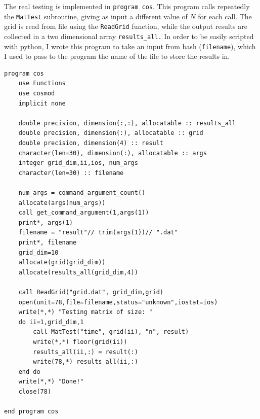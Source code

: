 \documentclass[a4paper]{article}
\begin{document}
\noindent The real testing is implemented in \lstinline{program cos}.
This program calls repeatedly the \lstinline{MatTest} subroutine, giving as input a different value of $N$ for each call.
The grid is read from file using the \lstinline{ReadGrid} function, while the output results are collected in a two dimensional array \lstinline{results_all.}
In order to be easily scripted with python, I wrote this program to take an input from bash (\lstinline{filename}), which I used to pass to the program the name of the file to store the results in.
\begin{lstlisting}
program cos
    use Functions
    use cosmod
    implicit none

    double precision, dimension(:,:), allocatable :: results_all
    double precision, dimension(:), allocatable :: grid
    double precision, dimension(4) :: result
    character(len=30), dimension(:), allocatable :: args
    integer grid_dim,ii,ios, num_args
    character(len=30) :: filename

    num_args = command_argument_count()
    allocate(args(num_args)) 
    call get_command_argument(1,args(1))
    print*, args(1)
    filename = "result"// trim(args(1))// ".dat"
    print*, filename 
    grid_dim=10
    allocate(grid(grid_dim))
    allocate(results_all(grid_dim,4))

    call ReadGrid("grid.dat", grid_dim,grid)
    open(unit=78,file=filename,status="unknown",iostat=ios)
    write(*,*) "Testing matrix of size: "
    do ii=1,grid_dim,1
        call MatTest("time", grid(ii), "n", result)
        write(*,*) floor(grid(ii))
        results_all(ii,:) = result(:)
        write(78,*) results_all(ii,:)
    end do
    write(*,*) "Done!"
    close(78)

end program cos
\end{lstlisting}
\end{document}
